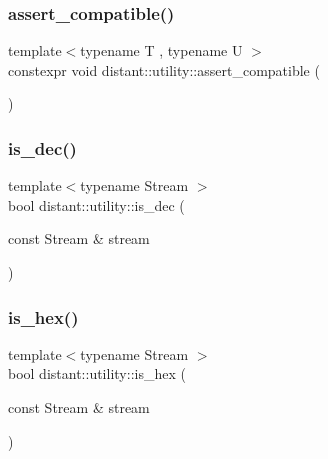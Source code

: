 \subsubsection{\texorpdfstring{assert\+\_\+compatible()}{assert\_compatible()}}
{\footnotesize\ttfamily template$<$typename T , typename U $>$ \\
constexpr void distant\+::utility\+::assert\+\_\+compatible (\begin{DoxyParamCaption}{ }\end{DoxyParamCaption})\hspace{0.3cm}{\ttfamily [noexcept]}}

\mbox{\label{namespacedistant_1_1utility_a555ff7ab9537f1ab2ec83d4e1f791ef5}} 
\subsubsection{\texorpdfstring{is\+\_\+dec()}{is\_dec()}}
{\footnotesize\ttfamily template$<$typename Stream $>$ \\
bool distant\+::utility\+::is\+\_\+dec (\begin{DoxyParamCaption}\item[{const Stream \&}]{stream }\end{DoxyParamCaption})\hspace{0.3cm}{\ttfamily [noexcept]}}

\mbox{\label{namespacedistant_1_1utility_acdbbfda9345d09ca6fc5206c6268e3e2}} 
\subsubsection{\texorpdfstring{is\+\_\+hex()}{is\_hex()}}
{\footnotesize\ttfamily template$<$typename Stream $>$ \\
bool distant\+::utility\+::is\+\_\+hex (\begin{DoxyParamCaption}\item[{const Stream \&}]{stream }\end{DoxyParamCaption})\hspace{0.3cm}{\ttfamily [noexcept]}}

